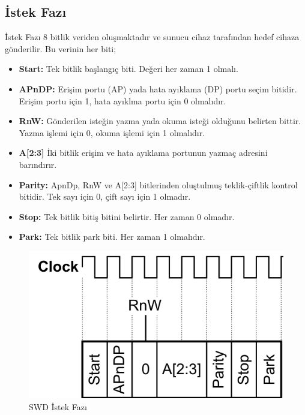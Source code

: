\subsection{İstek Fazı}

İstek Fazı 8 bitlik veriden oluşmaktadır ve sunucu cihaz tarafından hedef cihaza gönderilir. Bu verinin her biti;
\begin{itemize}
	\item \textbf{Start:} Tek bitlik başlangıç biti. Değeri her zaman 1 olmalı.
	\item \textbf{APnDP:} Erişim portu (AP) yada hata ayıklama (DP) portu seçim bitidir. Erişim portu için 1, hata ayıklma portu için 0 olmalıdır.
	\item \textbf{RnW:} Gönderilen isteğin yazma yada okuma isteği olduğunu belirten bittir. Yazma işlemi için 0, okuma işlemi için 1 olmalıdır.
	\item \textbf{A[2:3]} İki bitlik erişim ve hata ayıklama portunun yazmaç adresini barındırır.
	\item \textbf{Parity:} ApnDp, RnW ve A[2:3] bitlerinden oluştulmuş teklik-çiftlik kontrol bitidir. Tek sayı için 0, çift sayı için 1 olmadır.
	\item \textbf{Stop:} Tek bitlik bitiş bitini belirtir. Her zaman 0 olmadır.
	\item \textbf{Park:} Tek bitlik park biti. Her zaman 1 olmalıdır.
\end{itemize}

\begin{figure}[h]
\centering
\includegraphics[width=\textwidth]{gorseller/dataPhase}
\caption{SWD İstek Fazı}\label{fig:dataPhase}
\end{figure}

